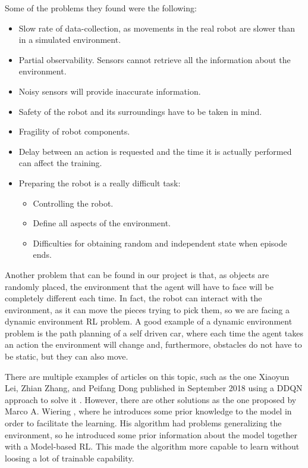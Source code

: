 		Some of the problems they found were the following:
		
		\begin{itemize}
			\item[\textendash]Slow rate of data-collection, as movements in the real robot are slower than in a simulated environment. 
			\item[\textendash]Partial observability. Sensors cannot retrieve all the information about the environment.
			\item[\textendash]Noisy sensors will provide inaccurate information.
			\item[\textendash]Safety of the robot and its surroundings have to be taken in mind.			
			\item[\textendash]Fragility of robot components.
			\item[\textendash]Delay between an action is requested and the time it is actually performed can affect the training.
			\item[\textendash]Preparing the robot is a really difficult task:			
			\begin{itemize}
				\item[\textendash] Controlling the robot.
				\item[\textendash] Define all aspects of the environment.
				\item[\textendash] Difficulties for obtaining random and independent state when episode ends.
			\end{itemize}
		\end{itemize}
		
		Another problem that can be found in our project is that, as objects are randomly placed, the environment that the agent will have to face will be completely different each time. In fact, the robot can interact with the environment, as it can move the pieces trying to pick them, so we are facing a dynamic environment RL problem. A good example of a dynamic environment problem is the path planning of a self driven car, where each time the agent takes an action the environment will change and, furthermore, obstacles do not have to be static, but they can also move.
		
		There are multiple examples of articles on this topic, such as the one Xiaoyun Lei, Zhian Zhang, and Peifang Dong published in September 2018 using a DDQN approach to solve it \cite{lei_dynamic_2018}. However, there are other solutions as the one proposed by Marco A. Wiering \cite{wiering_reinforcement_2001}, where he introduces some prior knowledge to the model in order to facilitate the learning. His algorithm had problems generalizing the environment, so he introduced some prior information about the model together with a Model-based RL. This made the algorithm more capable to learn without loosing a lot of trainable capability.
		
		
